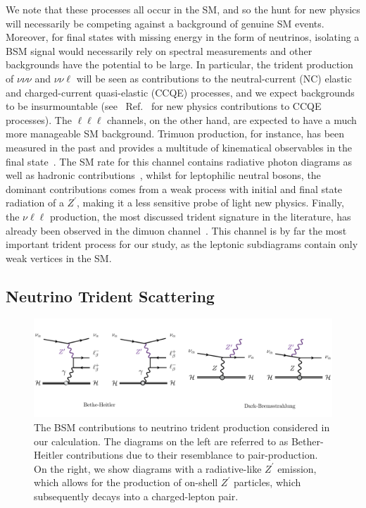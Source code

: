 We note that these processes all occur in the SM, and so the hunt for new physics will necessarily be competing against a background of genuine SM events. Moreover, for final states with missing energy in the form of neutrinos, isolating a BSM signal would necessarily rely on spectral measurements and other backgrounds have the potential to be large. In particular, the trident production of $\nu\nu\nu$ and $\nu\nu\ell$ will be seen as contributions to the neutral-current (NC) elastic and charged-current quasi-elastic (CCQE) processes, and we expect backgrounds to be insurmountable (see \eg\ Ref.~\cite{Kelly:2019wow} for new physics contributions to CCQE processes). The $\ell\ell\ell$ channels, on the other hand, are expected to have a much more manageable SM background. Trimuon production, for instance, has been measured in the past and provides a multitude of kinematical observables in the final state~\cite{Holder:1977gp,KayisTopaksu:2004ea}. The SM rate for this channel contains radiative photon diagrams as well as hadronic contributions~\cite{Benvenuti1977,Barish1977,Smith1978}, whilst for leptophilic neutral bosons, the dominant  contributions comes from a weak process with initial and final state radiation of a $Z^\prime$, making it a less sensitive probe of light new physics. Finally, the $\nu \ell \ell$ production, the most discussed trident signature in the literature, has already been observed in the dimuon channel~\cite{Geiregat:1990gz,Mishra:1991bv,Goncharov:2001qe}. This channel is by far the most important trident process for our study, as the leptonic subdiagrams contain only weak vertices in the SM.

\subsection{Neutrino Trident Scattering}

\begin{figure}
    \centering
    \includegraphics[width=\textwidth]{BSM_tridents.pdf}
\caption[New physics contributions to neutrino trident production.]{The BSM contributions to neutrino trident production considered in our calculation. The diagrams on the left are referred to as Bether-Heitler contributions due to their resemblance to pair-production. On the right, we show diagrams with a radiative-like $Z^\prime$ emission, which allows for the production of on-shell $Z^\prime$ particles, which subsequently decays into a charged-lepton pair.\label{fig:trident_diagrams}}
\end{figure}



